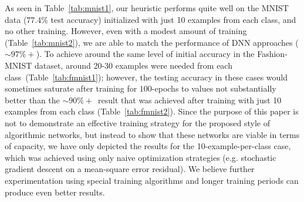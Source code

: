 \documentclass{article}
\begin{document}
\begin{table}[hbt!]
\vspace{-6mm}
\end{table}

As seen in Table~\ref{tab:mnist1}, our heuristic performs quite well on the MNIST data ($77.4\%$ test accuracy) initialized with just 10 examples from each class, and no other training. However, even with a modest amount of training (Table~\ref{tab:mnist2}), we are able to match the performance of DNN approaches ($\sim97\%+$).
To achieve around the same level of initial accuracy in the Fashion-MNIST dataset, around 20-30 examples were needed from each class~(Table~\ref{tab:fmnist1}); however, the testing accuracy in these cases would sometimes saturate after training for $100$-epochs to values not substantially better than the $\sim90\%+$~result that was achieved after training with just 10 examples from each class (Table~\ref{tab:fmnist2}). Since the purpose of this paper is not to demonstrate an effective training strategy for the proposed style of algorithmic networks, but instead to show that these networks are viable in terms of capacity, we have only depicted the results for the 10-example-per-class case, which was achieved using only naive optimization strategies (e.g. stochastic gradient descent on a mean-square error residual). We believe further experimentation using special training algorithms and longer training periods can produce even better results.
\end{document}
